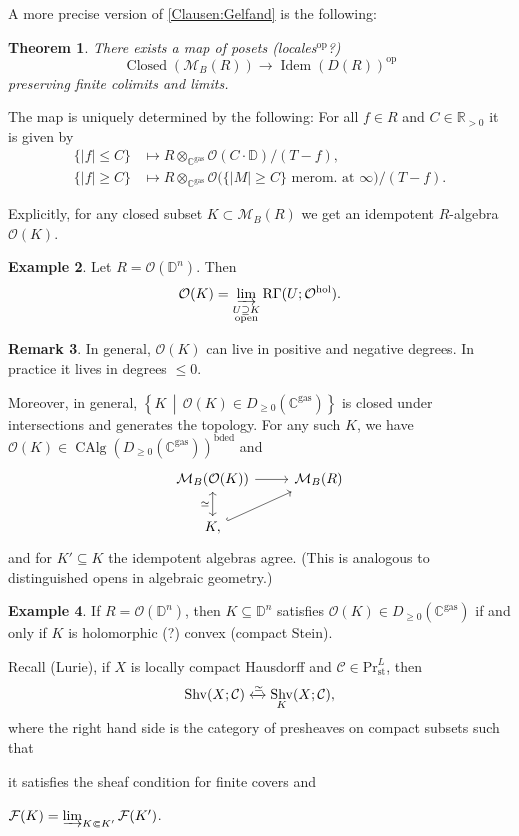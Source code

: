 \documentclass[draft]{amsart}
\newcommand{\DD}{\mathbb{D}}
\newcommand{\RR}{\mathbb{R}}
\newcommand{\CC}{\mathbb{C}}
\newcommand{\R}{\mathrm{R}}
\renewcommand{\O}{\mathcal{O}}
\newcommand{\set}[2]{\left\{#1\,\middle|\,#2\right\}}
\newcommand{\cat}[1]{\mathcal{#1}}
\newcommand{\sheaf}[1]{\mathcal{#1}}
\newcommand{\op}{\mathrm{op}}
\renewcommand{\Pr}{\mathrm{Pr}}
\DeclareMathOperator{\Closed}{Closed}
\DeclareMathOperator{\Idem}{Idem}
\DeclareMathOperator{\CAlg}{CAlg}
\DeclareMathOperator{\Shv}{Shv}
\newtheorem{thm}{Theorem}[section]
\theoremstyle{definition}
\newtheorem{rem}[thm]{Remark}
\newtheorem{ex}[thm]{Example}
\begin{document}
A more precise version of \cref{Clausen:Gelfand} is the following:
\begin{thm}
There exists a map of posets (locales$^{\op}$?)
\[
\Closed(\cat M_B(R)) \to \Idem(D(R))^\op
\]
preserving finite colimits and limits.
\end{thm}

The map is uniquely determined by the following: For all $f\in R$ and $C\in \RR_{>0}$ it is given by
\begin{align*}
\{\lvert f\rvert \le C\} &\mapsto R\otimes_{\CC^{\mathrm{gas}}} \O(C\cdot \DD) /(T-f), \\
\{\lvert f\rvert \ge C\} &\mapsto R\otimes_{\CC^{\mathrm{gas}}} \O\bigl(\{\lvert M\rvert \ge C\}\text{ merom. at $\infty$}\bigr)/(T-f).
\end{align*}

Explicitly, for any closed subset $K\subset \cat M_B(R)$ we get an idempotent $R$-algebra $\O(K)$.

\begin{ex}
Let $R = \O(\DD^n)$. Then 
\[
\O(K) = \varinjlim_{\substack{U\supseteq K\\ \text{open}}} \R\Gamma(U; \O^{\mathrm{hol}}).
\]
\end{ex}

\begin{rem}
In general, $\O(K)$ can live in positive and negative degrees. In practice it lives in degrees $\le 0$.

Moreover, in general, $\set{K}{\O(K) \in D_{\ge0}(\CC^{\mathrm{gas}})}$ is closed under intersections and generates the topology. For any such $K$, we have $\O(K) \in \CAlg(D_{\ge0}(\CC^{\mathrm{gas}}))^{\mathrm{bded}}$ and
\[
\begin{tikzcd}
\cat M_B(\O(K)) \ar[d,leftrightarrow,"\simeq"'] \ar[r] & \cat M_B(R) \\
K \ar[ur,hook],
\end{tikzcd}
\]
and for $K'\subseteq K$ the idempotent algebras agree. (This is analogous to distinguished opens in algebraic geometry.)
\end{rem}

\begin{ex}
If $R =\O(\DD^n)$, then $K \subseteq \DD^n$ satisfies $\O(K) \in D_{\ge0}(\CC^{\mathrm{gas}})$ if and only if $K$ is holomorphic (?) convex (compact Stein).
\end{ex}

Recall (Lurie), if $X$ is locally compact Hausdorff and $\cat C \in \Pr^L_{\mathrm{st}}$, then
\[
\Shv(X;\cat C) \xleftrightarrow{\simeq} \Shv_K(X;\cat C),
\]
where the right hand side is the category of presheaves on compact subsets such that 
\begin{enumerate*}[(1)]
\item it satisfies the sheaf condition for finite covers and 
\item $\sheaf F(K) = \varinjlim_{K\Subset K'} \sheaf F(K')$.
\end{enumerate*}
\end{document}
